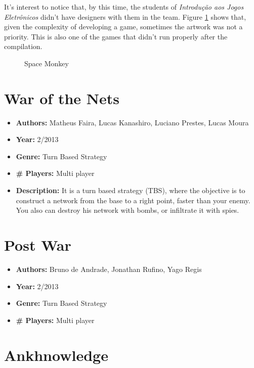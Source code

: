 \begin{apendicesenv}
It's interest to notice that, by this time, the students of \textit{Introdu\c{c}\~ao aos Jogos Eletr\^onicos} didn't have designers with them in the team. Figure \ref{fig:space_monkey} shows that, given the complexity of developing a game, sometimes the artwork was not a priority. This is also one of the games that didn't run properly after the compilation.

\begin{figure}[h!]
\centering
{}
\caption{Space Monkey}
\label{fig:space_monkey}
\end{figure}


\section{War of the Nets}
\label {sec:war}

\begin{itemize}
\item[] \textbf{Authors:} Matheus Faira, Lucas Kanashiro, Luciano Prestes, Lucas Moura
\item[] \textbf{Year:} 2/2013
\item[] \textbf{Genre:} Turn Based Strategy
\item[] \textbf{\# Players:} Multi player
\item[] \textbf{Description:} It is a turn based strategy (TBS), where the objective is to construct a network from the base to a right point, faster than your enemy. You also can destroy his network with bombs, or infiltrate it with spies.

\end{itemize}

\section{Post War}
\label {sec:post_war}

\begin{itemize}
\item[] \textbf{Authors:} Bruno de Andrade, Jonathan Rufino, Yago Regis
\item[] \textbf{Year:} 2/2013
\item[] \textbf{Genre:} Turn Based Strategy
\item[] \textbf{\# Players:} Multi player
\end{itemize}

\section{Ankhnowledge}
\label {sec:ankh}


\end{apendicesenv}
